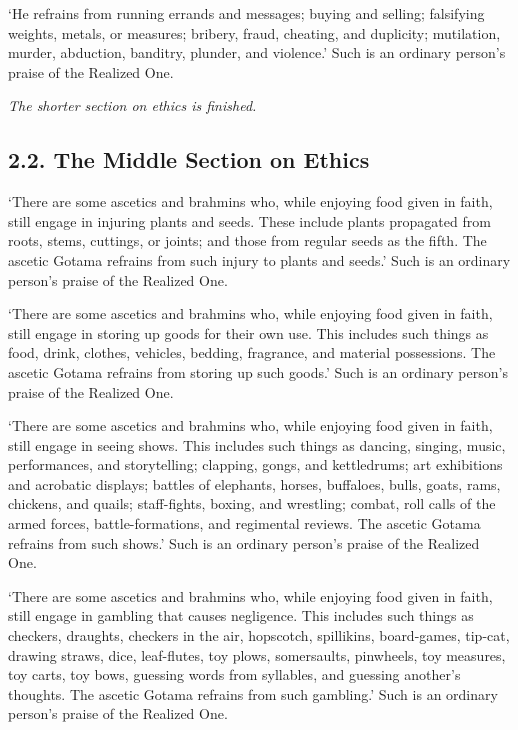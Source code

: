 \documentclass[12pt,openany]{book}%
\newcommand*{\scendsection}[1]{\begin{center}\textit{#1}\end{center}}
\begin{document}
‘He refrains from running errands and messages; buying and selling; falsifying weights, metals, or measures; bribery, fraud, cheating, and duplicity; mutilation, murder, abduction, banditry, plunder, and violence.’ Such is an ordinary person’s praise of the Realized One. 

\scendsection{The shorter section on ethics is finished. }

\subsection*{2.2. The Middle Section on Ethics }

‘There are some ascetics and brahmins who, while enjoying food given in faith, still engage in injuring plants and seeds. These include plants propagated from roots, stems, cuttings, or joints; and those from regular seeds as the fifth. The ascetic Gotama refrains from such injury to plants and seeds.’ Such is an ordinary person’s praise of the Realized One. 

‘There are some ascetics and brahmins who, while enjoying food given in faith, still engage in storing up goods for their own use. This includes such things as food, drink, clothes, vehicles, bedding, fragrance, and material possessions. The ascetic Gotama refrains from storing up such goods.’ Such is an ordinary person’s praise of the Realized One. 

‘There are some ascetics and brahmins who, while enjoying food given in faith, still engage in seeing shows. This includes such things as dancing, singing, music, performances, and storytelling; clapping, gongs, and kettledrums; art exhibitions and acrobatic displays; battles of elephants, horses, buffaloes, bulls, goats, rams, chickens, and quails; staff-fights, boxing, and wrestling; combat, roll calls of the armed forces, battle-formations, and regimental reviews. The ascetic Gotama refrains from such shows.’ Such is an ordinary person’s praise of the Realized One. 

‘There are some ascetics and brahmins who, while enjoying food given in faith, still engage in gambling that causes negligence. This includes such things as checkers, draughts, checkers in the air, hopscotch, spillikins, board-games, tip-cat, drawing straws, dice, leaf-flutes, toy plows, somersaults, pinwheels, toy measures, toy carts, toy bows, guessing words from syllables, and guessing another’s thoughts. The ascetic Gotama refrains from such gambling.’ Such is an ordinary person’s praise of the Realized One. 
\end{document}
